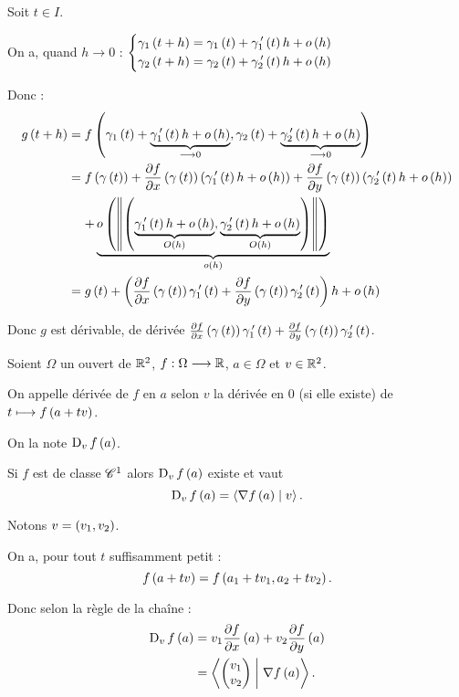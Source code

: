 \begin{dem}
Soit \(t\in I\).

On a, quand \(h\to0\) : \(\begin{dcases}
\gamma_1\left(t+h\right)=\gamma_1\left(t\right)+\gamma_1^{\,\prime}\left(t\right)h+o\left(h\right) \\
\gamma_2\left(t+h\right)=\gamma_2\left(t\right)+\gamma_2^{\,\prime}\left(t\right)h+o\left(h\right)
\end{dcases}\)

Donc : \[\begin{aligned}
g\paren{t+h}&=f\paren{\gamma_1\paren{t}+\underbrace{\gamma_1\prim\paren{t}h+o\paren{h}}_{\to0},\gamma_2\paren{t}+\underbrace{\gamma_2\prim\paren{t}h+o\paren{h}}_{\to0}} \\
&=f\paren{\gamma\paren{t}}+\pdv{f}{x}\paren{\gamma\paren{t}}\paren{\gamma_1\prim\paren{t}h+o\paren{h}}+\pdv{f}{y}\paren{\gamma\paren{t}}\paren{\gamma_2\prim\paren{t}h+o\paren{h}} \\
&\color{white}=\color{black}+\underbrace{o\paren{\norme{\paren{\underbrace{\gamma_1\prim\paren{t}h+o\paren{h}}_{O\paren{h}},\underbrace{\gamma_2\prim\paren{t}h+o\paren{h}}_{O\paren{h}}}}}}_{o\paren{h}} \\
&=g\paren{t}+\paren{\pdv{f}{x}\paren{\gamma\paren{t}}\gamma_1\prim\paren{t}+\pdv{f}{y}\paren{\gamma\paren{t}}\gamma_2\prim\paren{t}}h+o\paren{h}
\end{aligned}\]

Donc \(g\) est dérivable, de dérivée \(\pdv{f}{x}\left(\gamma\left(t\right)\right)\gamma_1^{\,\prime}\left(t\right)+\pdv{f}{y}\left(\gamma\left(t\right)\right)\gamma_2^{\,\prime}\left(t\right)\).
\end{dem}

\begin{defprop}
Soient \(\Omega\) un ouvert de \(\mathbb{R}^2\), \(f:\Omega\longrightarrow\mathbb{R}\), \(a\in\Omega\) et \(v\in\mathbb{R}^2\).

On appelle dérivée de \(f\) en \(a\) selon \(v\) la dérivée en \(0\) (si elle existe) de \(t\longmapsto f\left(a+tv\right)\).

On la note \(\operatorname{D}_{v}f\left(a\right)\).

Si \(f\) est de classe \(\mathscr{C}^{1}\) alors \(\operatorname{D}_{v}f\left(a\right)\) existe et vaut \[\operatorname{D}_{v}f\left(a\right)=\left\langle\nabla f\left(a\right)\;\middle|\; v\right\rangle.\]
\end{defprop}

\begin{dem}
Notons \(v=\left(v_1,v_2\right)\).

On a, pour tout \(t\) suffisamment petit : \[f\left(a+tv\right)=f\left(a_1+tv_1,a_2+tv_2\right).\]

Donc selon la règle de la chaîne : \[\begin{aligned}
\operatorname{D}_{v}f\left(a\right)&=v_1\pdv{f}{x}\left(a\right)+v_2\pdv{f}{y}\left(a\right) \\
&=\left\langle\begin{pmatrix}v_1\\v_2\end{pmatrix}\;\middle|\;\nabla f\left(a\right)\right\rangle.
\end{aligned}\]
\end{dem}

